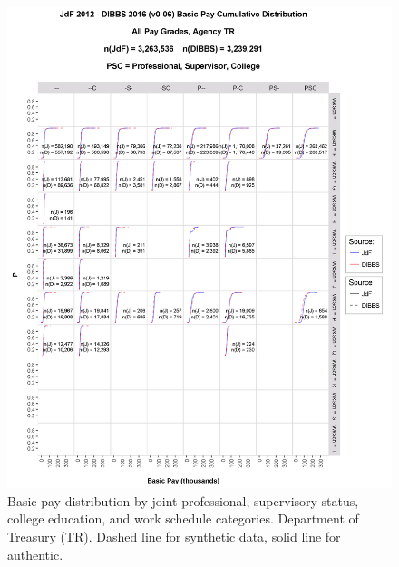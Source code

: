 \documentclass[10pt, letterpaper]{article}
\begin{document}
\begin{spacing}{1.0}
\begin{figure}[h]
    \centering
    \includegraphics[width=6.5in, trim={0 0 1in 1.5in}, clip]{JdFDIBBSBasicPayCDFTR.png}
    \caption{Basic pay distribution by joint professional, supervisory status, college education, and work schedule  categories.  Department of Treasury (TR).  Dashed line for synthetic data, solid line for authentic.}
    \label{figure:JdFDIBBSBasicPayCDFTR}
\end{figure}

\clearpage


\end{spacing}
\end{document}
